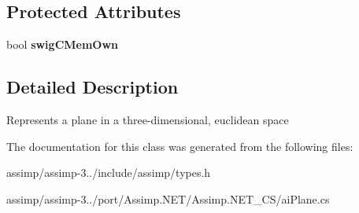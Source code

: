 \subsection*{Protected Attributes}
\begin{DoxyCompactItemize}
\item 
\hypertarget{structai_plane_a6c78ee7194e47edf406f3f14259e3ca5}{bool {\bfseries swig\+C\+Mem\+Own}}\label{structai_plane_a6c78ee7194e47edf406f3f14259e3ca5}

\end{DoxyCompactItemize}


\subsection{Detailed Description}
Represents a plane in a three-\/dimensional, euclidean space 

The documentation for this class was generated from the following files\+:\begin{DoxyCompactItemize}
\item 
assimp/assimp-\/3../include/assimp/types.\+h\item 
assimp/assimp-\/3../port/\+Assimp.\+N\+E\+T/\+Assimp.\+N\+E\+T\+\_\+\+C\+S/ai\+Plane.\+cs\end{DoxyCompactItemize}
